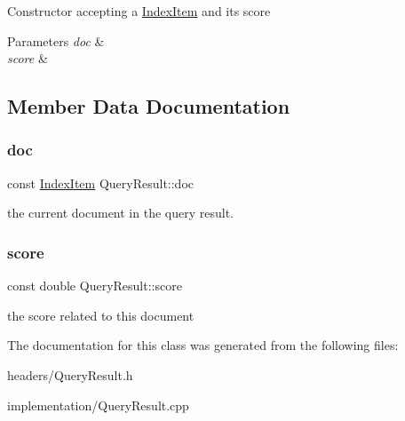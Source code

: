 Constructor accepting a \hyperlink{classIndexItem}{Index\+Item} and its score 
\begin{DoxyParams}{Parameters}
{\em doc} & \\
\hline
{\em score} & \\
\hline
\end{DoxyParams}


\subsection{Member Data Documentation}
\mbox{\label{classQueryResult_ab078a6cc489f8f8f05d7ea97d8514b82}} 
\subsubsection{\texorpdfstring{doc}{doc}}
{\footnotesize\ttfamily const \hyperlink{classIndexItem}{Index\+Item} Query\+Result\+::doc}

the current document in the query result. \mbox{\label{classQueryResult_ab76d940559daeac2b7eace3851c9a162}} 
\subsubsection{\texorpdfstring{score}{score}}
{\footnotesize\ttfamily const double Query\+Result\+::score}

the score related to this document 

The documentation for this class was generated from the following files\+:\begin{DoxyCompactItemize}
\item 
headers/Query\+Result.\+h\item 
implementation/Query\+Result.\+cpp\end{DoxyCompactItemize}
